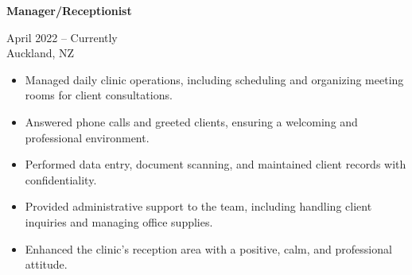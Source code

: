 \documentclass[10pt,a4paper,ragged2e,withhyper]{altacv}
\renewcommand{\cvevent}[4]{%
  \textbf{#1} %
  \hfill %
  \begin{minipage}[t]{.5\linewidth}
    \raggedleft %
    \small#3 %
    \\ %
    #4 %
  \end{minipage}
  \vspace{\baselineskip} %
}
\begin{document}
\vspace{0.5cm}


\begin{paracol}{2}
  \divider
  \divider
  \divider
  \divider
  \divider
  \divider
  \divider
  \divider
  \divider

  \divider

  \switchcolumn
  \divider
  \divider
  \divider
  \divider
  \divider
  \divider

  \divider
  \divider
  \divider
  \divider


  


\end{paracol}

\vspace{0.5cm}

\makeatletter
\makeatother


\cvevent{Manager/Receptionist}{Bonita Brazilian Beauty}{April 2022 -- Currently}{Auckland, NZ}
\begin{itemize}
  \item Managed daily clinic operations, including scheduling and organizing meeting rooms for client consultations.
  \item Answered phone calls and greeted clients, ensuring a welcoming and professional environment.
  \item Performed data entry, document scanning, and maintained client records with confidentiality.
  \item Provided administrative support to the team, including handling client inquiries and managing office supplies.
  \item Enhanced the clinic's reception area with a positive, calm, and professional attitude.
\end{itemize}
\end{document}
